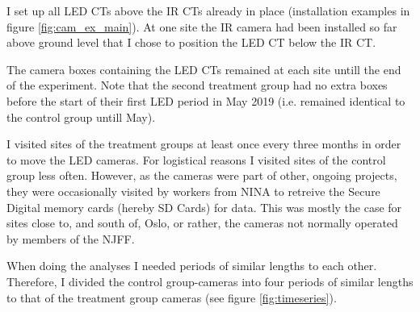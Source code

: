 I set up all LED CTs above the IR CTs already in place (installation examples in figure \ref{fig:cam_ex_main}). 
At one site the IR camera had been installed so far above ground level that I chose to position the LED CT below the IR CT. %

The camera boxes containing the LED CTs remained at each site untill the end of the experiment. Note that the second treatment group had no extra boxes before the start of their first LED period in May 2019 (i.e. remained identical to the control group untill May).   






I visited sites of the treatment groups at least once every three months in order to move the LED cameras.
For logistical reasons I visited sites of the control group less often.
However, as the cameras were part of other, ongoing projects, they were occasionally visited by workers from NINA to retreive the Secure Digital memory cards (hereby SD Cards) for data. %
This was mostly the case for sites close to, and south of, Oslo, or rather, the cameras not normally operated by members of the NJFF.

When doing the analyses I needed periods of similar lengths to each other. Therefore, I divided the control group-cameras into four periods of similar lengths to that of the treatment group cameras (see figure \ref{fig:timeseries}). %




